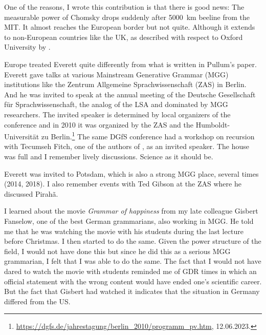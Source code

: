 \documentclass[output=paper,colorlinks,citecolor=brown]{langscibook}
\begin{document}
One of the reasons, I wrote this contribution is that
there is good news: The measurable power of Chomsky drops suddenly after 5000~km beeline from the
MIT. It almost reaches the European border but not quite. Although it extends to non-European countries like
the UK, as described with respect to Oxford University by . 

Europe treated Everett quite differently from what is written in Pullum's paper. Everett gave talks at
various Mainstream Generative Grammar (MGG) institutions like the Zentrum Allgemeine
Sprachwissenschaft (ZAS) in Berlin. And he was invited to
speak at the annual meeting of the Deutsche Gesellschaft für Sprachwissenschaft, the analog of the
LSA and dominated by MGG researchers. The invited speaker is determined by local organizers of the
conference and in 2010 it was organized by the ZAS and the Humboldt-Universität zu Berlin.\footnote{
\url{https://dgfs.de/jahrestagung/berlin_2010/programm_pv.htm}, 12.06.2023.
}
The same DGfS conference had a workshop on recursion with Tecumseh Fitch, one of the authors of
, as an invited speaker. The house was full and I remember lively
discussions. Science as it should be.

Everett was invited to Potsdam, which is also a strong MGG place, several times (2014, 2018). I also
remember events with Ted Gibson at the ZAS where he discussed Pirahã.

I learned about the movie \emph{Grammar of happiness} from my late colleague Gisbert Fanselow, one of
the best German grammarians, also working in MGG. He told me that he was watching the movie with his
students during the last lecture before Christmas. I then started to do the same. Given the power
structure of the field, I would not have done this but since he did this as a serious MGG grammarian, I
felt that I was able to do the same. The fact that I would not have dared to watch the movie with
students reminded me of GDR times in which an official statement with the wrong content would have
ended one's scientific career. But the fact that Gisbert had watched it indicates that the situation in
Germany differed from the US.



\end{document}

